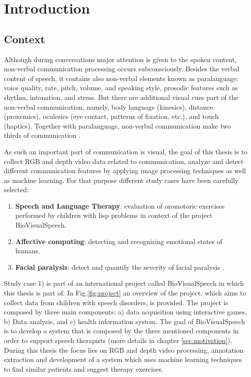 \newcommand{\unlthesis}{\emph{unlthesis}}
\newcommand{\unlthesisclass}{\texttt{unlthesis.cls}}


\chapter{Introduction}
\label{cha:introduction}

\section{Context}

Although during conversations major attention is given to the spoken content, non-verbal communication processing occurs subconsciously. Besides the verbal content of speech, it contains also non-verbal elements known as paralanguage: voice quality, rate, pitch, volume, and speaking style, prosodic features such as rhythm, intonation, and stress. But there are additional visual cues part of the non-verbal communication, namely, body language (kinesics), distance (proxemics), oculesics (eye contact, patterns of fixation, etc.), and touch (haptics). Together with paralanguage, non-verbal communication make two thirds of communication \cite{Burgoon2016}.

As such an important part of communication is visual, the goal of this thesis is to collect RGB and depth video data related to communication, analyze and detect different communication features by applying image processing techniques as well as machine learning. For that purpose different study cases have been carefully selected:
\begin{enumerate}
    \item \textbf{Speech and Language Therapy}: evaluation of oromotoric exercises performed by children with lisp problems in context of the project BioVisualSpeech.
    \item \textbf{Affective computing}: detecting and recognizing emotional states of humans.
    \item \textbf{Facial paralysis}: detect and quantify the severity of facial paralysis \cite{Ngo2016}\cite{Sundaraj2012}.
\end{enumerate}

Study case 1) is part of an international project called BioVisualSpeech in which this thesis is part of. In Fig.\ref{fig:project} an overview of the project, which aims to collect data from children with speech disorders, is provided. The project is composed by three main components: a) data acquisition using interactive games, b) Data analysis, and c) health information system. The goal of BioVisualSpeech is to develop a system that is composed by the three mentioned components in order to support speech therapists (more details in chapter \ref{sec:motivation}). During this thesis the focus lies on RGB and depth video processing, annotation extraction and development of a system which uses machine learning techniques to find similar patients and suggest therapy exercises. 


